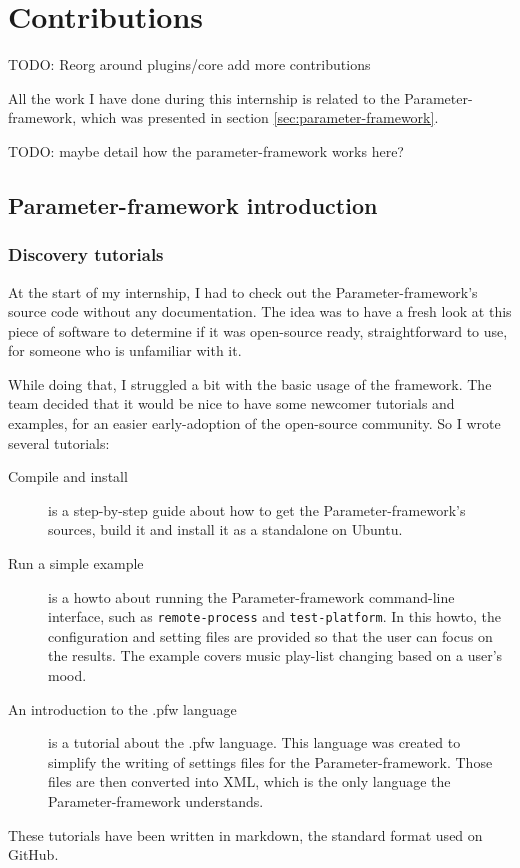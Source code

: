 \chapter{Contributions}\label{chap:contributions}

TODO:
Reorg around plugins/core add more contributions

\begin{sectionIntro}
    All the work I have done during this internship is related
    to the Parameter-framework, which was presented in section \ref{sec:parameter-framework}.

    TODO: maybe detail how the parameter-framework works here?
\end{sectionIntro}

\section{Parameter-framework introduction}
\subsection{Discovery tutorials}\label{sec:tutorials}

At the start of my internship, I had to check out the Parameter-framework's
source code without any documentation. The idea was to have a fresh look at
this piece of software to determine if it was open-source ready, straightforward
to use, for someone who is unfamiliar with it.

While doing that, I struggled a bit with the basic usage of the framework. The
team decided that it would be nice to have some newcomer tutorials and examples,
for an easier early-adoption of the open-source community. So I wrote several
tutorials:
\begin{description}
    \item[Compile and install]
        is a step-by-step guide about how to get the Parameter-framework's sources,
        build it and install it as a standalone on Ubuntu.
    \item[Run a simple example]
        is a howto about running the Parameter-framework command-line interface,
        such as \lstinline{remote-process} and \lstinline {test-platform}.  In
        this howto, the configuration and setting files are provided so that
        the user can focus on the results. The example covers music play-list
        changing based on a user's mood.
    \item[An introduction to the .pfw language]\label{desc:pfw-language}
        is a tutorial about the .pfw language. This language was
        created to simplify the writing of settings files for the
        Parameter-framework. Those files are then converted into XML, which is
        the only language the Parameter-framework understands.
\end{description}
These tutorials have been written in \gls{markdown}, the standard format used
on GitHub.

